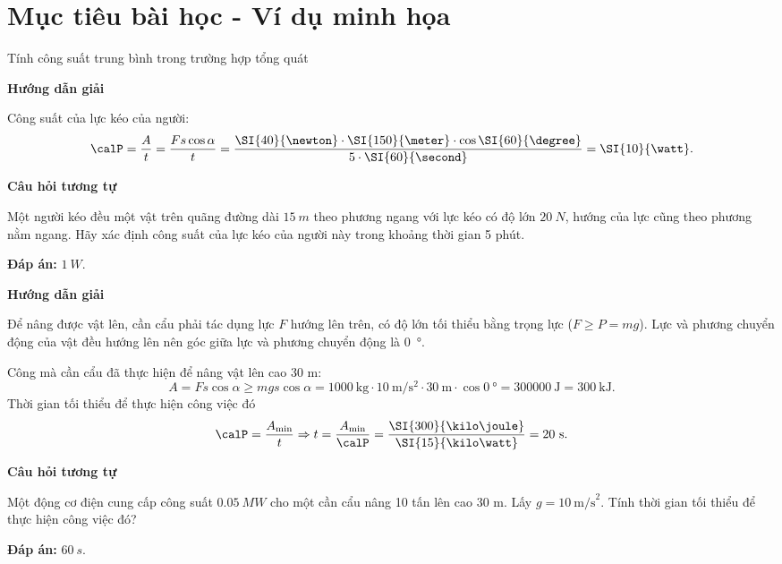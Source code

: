 \section{Mục tiêu bài học - Ví dụ minh họa}
\begin{dang}{Tính công suất trung bình trong trường hợp tổng quát}
	{	\begin{center}
			\textbf{Hướng dẫn giải}
		\end{center}
		Công suất của lực kéo của người:
		$$\calP = \dfrac{A}{t} = \dfrac{Fs\cos \alpha}{t}=\dfrac{\SI{40}{\newton}\cdot\SI{150}{\meter
			}\cdot\cos\SI{60}{\degree}}{5\cdot\SI{60}{\second}}= \SI{10}{\watt}.$$
		
		\begin{center}
			\textbf{Câu hỏi tương tự}
		\end{center}
		
		Một người kéo đều một vật trên quãng đường dài $\SI{15}{m}$ theo phương ngang với lực kéo có độ lớn $\SI{20}{N}$, hướng của lực cũng theo phương nằm ngang. Hãy xác định công suất của lực kéo của người này trong khoảng thời gian 5 phút.
		
		\textbf{Đáp án:} $\SI{1}{W}$.
	}
	{	\begin{center}
			\textbf{Hướng dẫn giải}
		\end{center}
		Để nâng được vật lên, cần cẩu phải tác dụng lực $F$ hướng lên trên, có độ lớn tối thiểu bằng trọng lực ($F\geq P=mg$). Lực và phương chuyển động của vật đều hướng lên nên góc giữa lực và phương chuyển động là \SI{0}{\degree}.
		
		Công mà cần cẩu đã thực hiện để nâng vật lên cao 30 m:
		\begin{equation*}
			A=Fs \cos \alpha \geq mg s\cos \alpha =\SI{1000}{\kilogram}\cdot\SI{10}{\meter/\second^2}\cdot\SI{30}{\meter}\cdot\cos\SI{0}{\degree}= \SI{300000}{\joule}=\SI{300}{\kilo\joule}.
		\end{equation*}
		Thời gian tối thiểu để thực hiện công việc đó
		\begin{equation*}
			\calP=\dfrac{A_{\min}}{t} \Rightarrow t =\dfrac{A_{\min}}{\calP}=\dfrac{\SI{300}{\kilo\joule}}{\SI{15}{\kilo\watt}}= 20\ \text{s}.
		\end{equation*}
		
		
		\begin{center}
			\textbf{Câu hỏi tương tự}
		\end{center}
		
		Một động cơ điện cung cấp công suất $\SI{0.05}{MW}$ cho một cần cẩu nâng 10 tấn lên cao 30 m. Lấy $g=10\ \text{m/s}^2$. Tính thời gian tối thiểu để thực hiện công việc đó?
		
		\textbf{Đáp án:} $\SI{60}{s}$.
		
		
	}
\end{dang}


